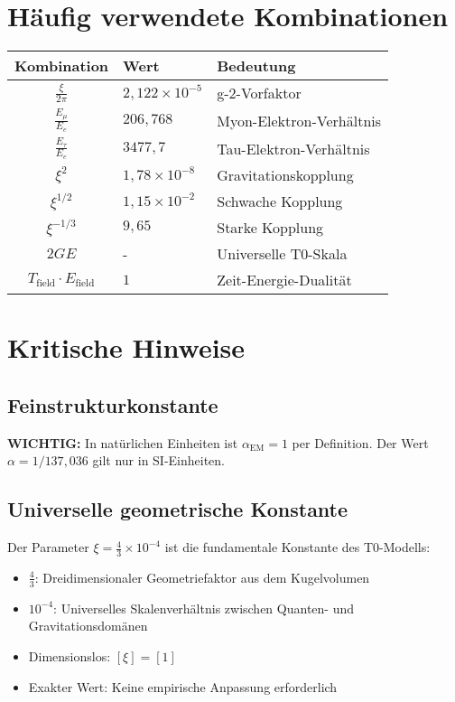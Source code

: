 \documentclass[12pt,a4paper]{report}
\begin{document}
	\section{Häufig verwendete Kombinationen}
	\label{sec:common_combinations}
	
	\begin{longtable}{|c|l|l|}
		\hline
		\textbf{Kombination} & \textbf{Wert} & \textbf{Bedeutung} \\
		\hline
		$\frac{\xi}{2\pi}$ & $2,122 \times 10^{-5}$ & g-2-Vorfaktor \\
		$\frac{E_\mu}{E_e}$ & $206,768$ & Myon-Elektron-Verhältnis \\
		$\frac{E_\tau}{E_e}$ & $3477,7$ & Tau-Elektron-Verhältnis \\
		$\xi^2$ & $1,78 \times 10^{-8}$ & Gravitationskopplung \\
		$\xi^{1/2}$ & $1,15 \times 10^{-2}$ & Schwache Kopplung \\
		$\xi^{-1/3}$ & $9,65$ & Starke Kopplung \\
		$2GE$ & - & Universelle T0-Skala \\
		$T_{\text{field}} \cdot E_{\text{field}}$ & $1$ & Zeit-Energie-Dualität \\
		\hline
	\end{longtable}
	
	\section{Kritische Hinweise}
	\label{sec:critical_notes}
	
	\subsection{Feinstrukturkonstante}
	\textbf{WICHTIG:} In natürlichen Einheiten ist $\alpha_{\text{EM}} = 1$ per Definition.
	Der Wert $\alpha = 1/137,036$ gilt nur in SI-Einheiten.
	
	\subsection{Universelle geometrische Konstante}
	Der Parameter $\xi = \frac{4}{3} \times 10^{-4}$ ist die fundamentale Konstante des T0-Modells:
	\begin{itemize}
		\item $\frac{4}{3}$: Dreidimensionaler Geometriefaktor aus dem Kugelvolumen
		\item $10^{-4}$: Universelles Skalenverhältnis zwischen Quanten- und Gravitationsdomänen
		\item Dimensionslos: $[\xi] = [1]$
		\item Exakter Wert: Keine empirische Anpassung erforderlich
	\end{itemize}
	
\end{document}
